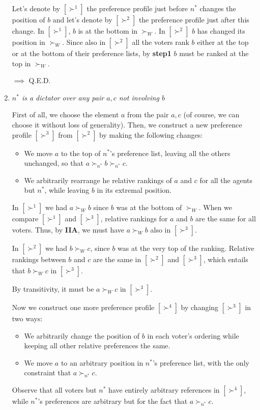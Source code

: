 \documentclass[pt11,a4paper,twoside,reqno,openright]{paper}
\begin{document}
\begin{enumerate}
	\noindent Let's denote by $[\succ^1]$ the preference profile just before 
	$n^*$ changes the position of $b$ and let's denote by $[\succ^2]$ the 
	preference profile just after this change. In $[\succ^1]$, $b$ is at the 
	bottom in $\succ_W$. In $[\succ^2]$ $b$ has changed its position in 
	$\succ_W$. Since also in $[\succ^2]$ all the voters rank $b$ either at the 
	top or at the bottom of their preference lists, by \textbf{step1} $b$ must 
	be ranked at the top in $\succ_W$.

	\noindent $\implies$ Q.E.D.

	\item \textit{$n^*$ is a dictator over any pair $a,c$ not involving $b$}

	\noindent First of all, we choose the element $a$ from the pair $a,c$ (of 
	course, we can choose it without loss of generality). Then, we construct a 
	new preference profile $[\succ^3]$ from $[\succ^2]$ by making the following 
	changes:
	\begin{itemize}
		\item We move $a$ to the top of $n^*$'s preference list, leaving all 
		the others unchanged, so that $a \succ_{n^*} b \succ_{n^*} c$.
		\item We arbitrarily rearrange he relative rankings of $a$ and $c$ for 
		all the agents but $n^*$, while leaving $b$ in its extremal position.
	\end{itemize}
	In $[\succ^1]$ we had $a \succ_W b$ since $b$ was at the bottom of 
	$\succ_W$. When we compare $[\succ^1]$ and $[\succ^3]$, relative rankings 
	for $a$ and $b$ are the same for all voters. Thus, by \textbf{IIA}, we must 
	have $a \succ_W b$ also in $[\succ^3]$.

	\noindent In $[\succ^2]$ we had $b \succ_W c$, since $b$ was at the very top 
	of the ranking. Relative rankings between $b$ and $c$ are the same in 
	$[\succ^2]$ and $[\succ^3]$, which entails that $b \succ_W c$ in $[\succ^3]$.

	\noindent By transitivity, it must be $a \succ_W c$ in $[\succ^3]$.

	\noindent Now we construct one more preference profile $[\succ^4]$ by 
	changing $[\succ^3]$ in two ways:
	\begin{itemize}
		\item We arbitrarily change the position of $b$ in each voter's ordering 
		while keeping all other relative preferences the same.
		\item We move $a$ to an arbitrary position in $n^*$'s preference list, 
		with the only constraint that $a \succ_{n^*} c$.
	\end{itemize}
	Observe that all voters but $n^*$ have entirely arbitrary references in 
	$[\succ^4]$, while $n^*$'s preferences are arbitrary but for the fact that 
	$a \succ_{n^*} c$.


\end{enumerate}
\end{document}
